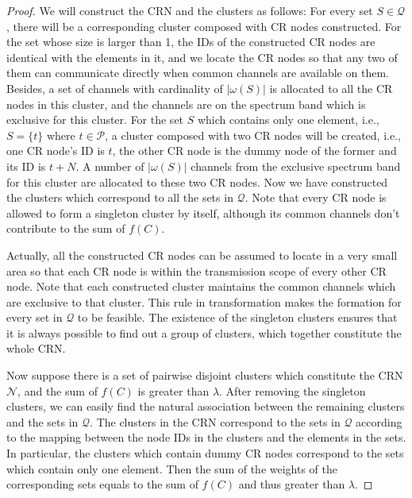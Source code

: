 \documentclass[times]{ettauth}
\newcommand{\ie}{i.e., }
\theoremstyle{mytheoremstyle}
\theoremstyle{mytheoremstyle}
\theoremstyle{mytheoremstyle}
\begin{document}
\begin{proof}
We will construct the CRN and the clusters as follows:
For every set $S\in \mathcal{Q}$, there will be a corresponding cluster composed with CR nodes constructed.
For the set whose size is larger than 1, the IDs of the constructed CR nodes are identical with the elements in it, and we locate the CR nodes so that any two of them can communicate directly when common channels are available on them.
Besides, a set of channels with cardinality of $|\omega(S)|$ is allocated to all the CR nodes in this cluster, and the channels are on the spectrum band which is exclusive for this cluster.
For the set $S$ which contains only one element, \ie $S =\{t\}$ where $t\in\mathcal{P}$, a cluster composed with two CR nodes will be created, \ie one CR node's ID is $t$, the other CR node is the dummy node of the former and its ID is $t+N$.
A number of $|\omega(S)|$ channels from the exclusive spectrum band for this cluster are allocated to these two CR nodes.
Now we have constructed the clusters which correspond to all the sets in $\mathcal{Q}$.
Note that every CR node is allowed to form a singleton cluster by itself, although its common channels don't contribute to the sum of $f(C)$.

Actually, all the constructed CR nodes can be assumed to locate in a very small area so that each CR node is within the transmission scope of every other CR node.
Note that each constructed cluster maintains the common channels which are exclusive to that cluster.
This rule in transformation makes the formation for every set in $\mathcal{Q}$ to be feasible.
The existence of the singleton clusters ensures that it is always possible to find out a group of clusters, which together constitute the whole CRN.

Now suppose there is a set of pairwise disjoint clusters which constitute the CRN $\mathcal{N}$, and the sum of $f(C)$ is greater than $\lambda$.
After removing the singleton clusters, we can easily find the natural association between the remaining clusters and the sets in $\mathcal{Q}$. 
The clusters in the CRN correspond to the sets in $\mathcal{Q}$ according to the mapping between the node IDs in the clusters and the elements in the sets.
In particular, the clusters which contain dummy CR nodes correspond to the sets which contain only one element.
Then the sum of the weights of the corresponding sets equals to the sum of $f(C)$ and thus greater than $\lambda$.





\end{proof}
\end{document}
